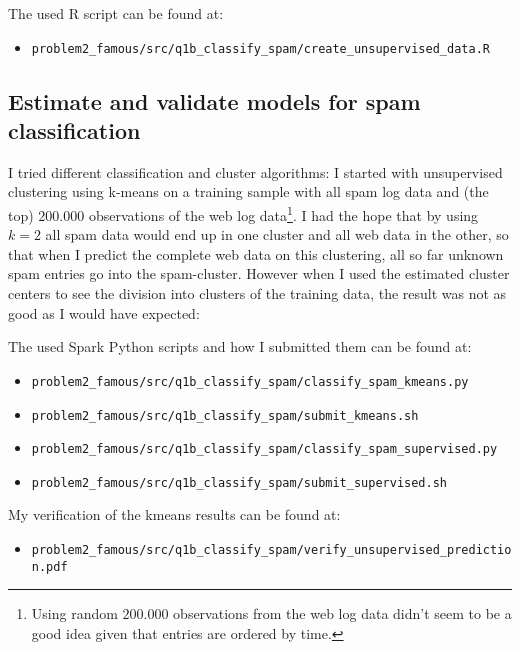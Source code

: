 \documentclass{article}\usepackage[]{graphicx}\usepackage[]{color}
\begin{document}
\bigskip
The used R script can be found at:
\begin{itemize}
	\item \verb+problem2_famous/src/q1b_classify_spam/create_unsupervised_data.R+
\end{itemize}


\subsection{Estimate and validate models for spam classification} %
\label{sub:estimate_and_validate_models_for_spam_classification}
I tried different classification and cluster algorithms: I started with unsupervised clustering using k-means on a training sample with all spam log data and (the top) $200.000$ observations of the web log data\footnote{Using random $200.000$ observations from the web log data didn't seem to be a good idea given that entries are ordered by time.}. I had the hope that by using $k=2$ all spam data would end up in one cluster and all web data in the other, so that when I predict the complete web data on this clustering, all so far unknown spam entries go into the spam-cluster. However when I used the estimated cluster centers to see the division into clusters of the training data, the result was not as good as I would have expected:

\bigskip
The used Spark Python scripts and how I submitted them can be found at:
\begin{itemize}
	\item \verb+problem2_famous/src/q1b_classify_spam/classify_spam_kmeans.py+
	\item \verb+problem2_famous/src/q1b_classify_spam/submit_kmeans.sh+
	\item \verb+problem2_famous/src/q1b_classify_spam/classify_spam_supervised.py+
	\item \verb+problem2_famous/src/q1b_classify_spam/submit_supervised.sh+
\end{itemize}

My verification of the kmeans results can be found at:
\begin{itemize}
	\item \verb+problem2_famous/src/q1b_classify_spam/verify_unsupervised_prediction.pdf+
\end{itemize}

\end{document}
